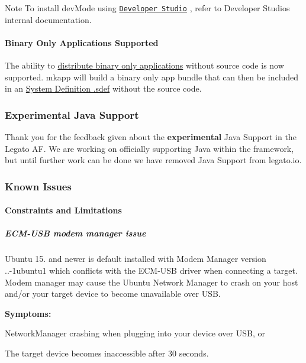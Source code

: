 \begin{DoxyNote}{Note}
To install {\ttfamily dev\+Mode} using \href{https://source.sierrawireless.com/resources/airprime/software/developer-studio-installinstructions}{\tt Developer Studio} , refer to Developer Studio\textquotesingle{}s internal documentation.
\end{DoxyNote}
\hypertarget{releaseNotes16103_rn16_10_3_binaryapps}{}\paragraph{Binary Only Applications Supported}\label{releaseNotes16103_rn16_10_3_binaryapps}
The ability to \hyperlink{buildToolsmkapp}{distribute binary only applications} without source code is now supported. {\ttfamily mkapp} will build a binary only app bundle that can then be included in an \hyperlink{defFilesSdef}{System Definition .sdef} without the source code.\hypertarget{releaseNotes16103_rn16_10_3_removeJava}{}\subsubsection{Experimental Java Support}\label{releaseNotes16103_rn16_10_3_removeJava}
Thank you for the feedback given about the {\bfseries experimental} Java Support in the Legato AF. We are working on officially supporting Java within the framework, but until further work can be done we have removed Java Support from legato.\+io.\hypertarget{releaseNotes16103_rn16_10_3_KnownIssues}{}\subsubsection{Known Issues}\label{releaseNotes16103_rn16_10_3_KnownIssues}
\hypertarget{releaseNotes16103_rn16_10_3_Constraints}{}\paragraph{Constraints and Limitations}\label{releaseNotes16103_rn16_10_3_Constraints}
\hypertarget{releaseNotes16103_rn16_10_3_ConstECMUSB}{}\subparagraph{E\+C\+M-\/\+U\+S\+B modem manager issue}\label{releaseNotes16103_rn16_10_3_ConstECMUSB}
Ubuntu 15. and newer is default installed with Modem Manager version {..-\/1ubuntu1} which conflicts with the E\+C\+M-\/\+U\+SB driver when connecting a target. Modem manager may cause the Ubuntu Network Manager to crash on your host and/or your target device to become unavailable over U\+SB.

{\bfseries Symptoms\+:} 
\begin{DoxyItemize}
\item Network\+Manager crashing when plugging into your device over U\+SB, or
\item The target device becomes inaccessible after 30 seconds.
\end{DoxyItemize}

